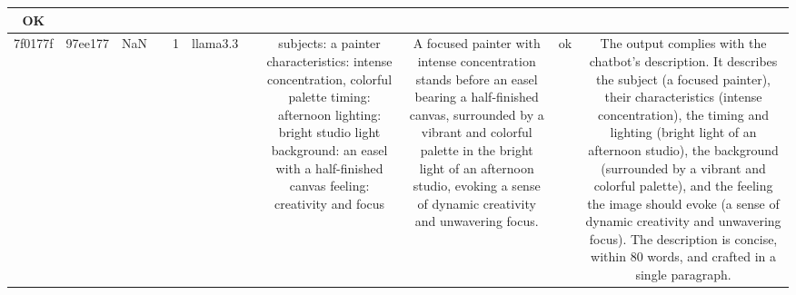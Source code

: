 \begin{table}[h!]
\begin{tabular}{|c|c|c|c|c|c|c|c|c|c|c|}
OK\\
\hline
7f0177f & 97ee177 & NaN &  & 1 & llama3.3 &  & subjects: a painter
characteristics: intense concentration, colorful palette
timing: afternoon
lighting: bright studio light
background: an easel with a half-finished canvas
feeling: creativity and focus & A focused painter with intense concentration stands before an easel bearing a half-finished canvas, surrounded by a vibrant and colorful palette in the bright light of an afternoon studio, evoking a sense of dynamic creativity and unwavering focus. & ok & The output complies with the chatbot's description. It describes the subject (a focused painter), their characteristics (intense concentration), the timing and lighting (bright light of an afternoon studio), the background (surrounded by a vibrant and colorful palette), and the feeling the image should evoke (a sense of dynamic creativity and unwavering focus). The description is concise, within 80 words, and crafted in a single paragraph.


\end{tabular}
\end{table}
